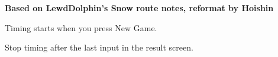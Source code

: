 \documentclass[a4paper, fontsize=11pt, DIV=26, parskip=full]{scrartcl}
\begin{document}
	\textbf{\Large Based on LewdDolphin's Snow route notes, reformat by Hoishin}

	Timing starts when you press New Game.

	\hrulefill
	
	\hrulefill
	
	\hrulefill
	
	\hrulefill
	
	\hrulefill
	
	\hrulefill
	
	\hrulefill
	
	\hrulefill
	
	\hrulefill
	
	\hrulefill
	
	\hrulefill
	
	\hrulefill
	
	\hrulefill
	

	Stop timing after the last input in the result screen.
\end{document}
